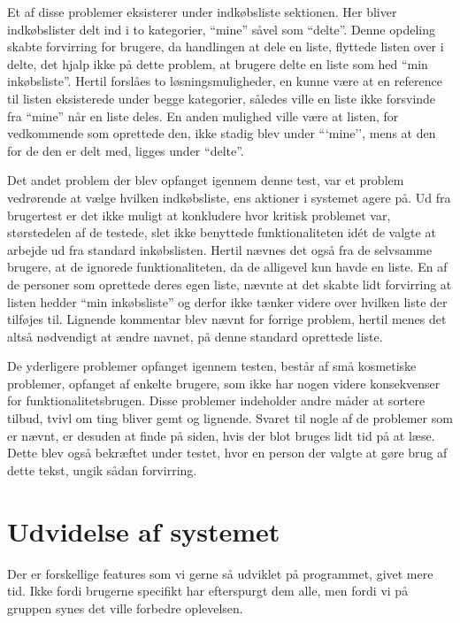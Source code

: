 Et af disse problemer eksisterer under indkøbsliste sektionen.
Her bliver indkøbslister delt ind i to kategorier, ``mine'' såvel som ``delte''.
Denne opdeling skabte forvirring for brugere, da handlingen at dele en liste, flyttede listen over i delte, det hjalp ikke på dette problem, at brugere delte en liste som hed ``min inkøbsliste''.
Hertil forslåes to løsningsmuligheder, en kunne være at en reference til listen eksisterede under begge kategorier, således ville en liste ikke forsvinde fra ``mine'' når en liste deles.
En anden mulighed ville være at listen, for vedkommende som oprettede den, ikke stadig blev under ```mine'', mens at den for de den er delt med, ligges under ``delte''.

Det andet problem der blev opfanget igennem denne test, var et problem vedrørende at vælge hvilken indkøbsliste, ens aktioner i systemet agere på.
Ud fra brugertest er det ikke muligt at konkludere hvor kritisk problemet var, størstedelen af de testede, slet ikke benyttede funktionaliteten idét de valgte at arbejde ud fra standard inkøbslisten.
Hertil nævnes det også fra de selvsamme brugere, at de ignorede funktionaliteten, da de alligevel kun havde en liste.
En af de personer som oprettede deres egen liste, nævnte at det skabte lidt forvirring at listen hedder ``min inkøbsliste'' og derfor ikke tænker videre over hvilken liste der tilføjes til.
Lignende kommentar blev nævnt for forrige problem, hertil menes det altså nødvendigt at ændre navnet, på denne standard oprettede liste.

De yderligere problemer opfanget igennem testen, består af små kosmetiske problemer, opfanget af enkelte brugere, som ikke har nogen videre konsekvenser for funktionalitetsbrugen.
Disse problemer indeholder andre måder at sortere tilbud, tvivl om ting bliver gemt og lignende.
Svaret til nogle af de problemer som er nævnt, er desuden at finde på siden, hvis der blot bruges lidt tid på at læse.
Dette blev også bekræftet under testet, hvor en person der valgte at gøre brug af dette tekst, ungik sådan forvirring.


\section{Udvidelse af systemet}\label{udvidelse}

Der er forskellige features som vi gerne så udviklet på programmet, givet mere tid. Ikke fordi brugerne specifikt har efterspurgt dem alle, men fordi vi på gruppen synes det ville forbedre oplevelsen.


